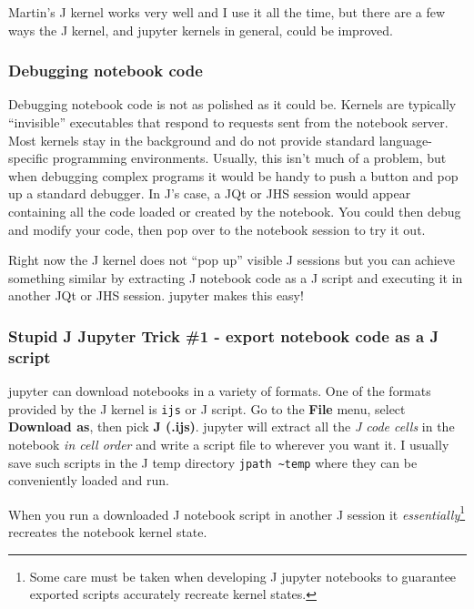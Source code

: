 Martin's J kernel works very well and I use it all the time, but there
are a few ways the J kernel, and jupyter kernels in general, could be
improved.

\hypertarget{debugging-notebook-code}{%
\subsubsection*{Debugging notebook code}\label{debugging-notebook-code}}

Debugging notebook code is not as polished as it could be. Kernels are
typically ``invisible'' executables that respond to requests sent from
the notebook server. Most kernels stay in the background and do not
provide standard language-specific programming environments. Usually,
this isn't much of a problem, but when debugging complex programs it
would be handy to push a button and pop up a standard debugger. In J's
case, a JQt or JHS session would appear containing all the code loaded
or created by the notebook. You could then debug and modify your code,
then pop over to the notebook session to try it out.

Right now the J kernel does not ``pop up'' visible J sessions but you
can achieve something similar by extracting J notebook code as a J
script and executing it in another JQt or JHS session. jupyter makes
this easy!

\hypertarget{stupid-j-jupyter-trick-1---export-notebook-code-as-a-j-script}{%
\subsubsection*{Stupid J Jupyter Trick \#1 - export notebook code as a J
script}\label{stupid-j-jupyter-trick-1---export-notebook-code-as-a-j-script}}

jupyter can download notebooks in a variety of formats. One of the
formats provided by the J kernel is \texttt{ijs} or J script. Go to the
\textbf{File} menu, select \textbf{Download as}, then pick \textbf{J
(.ijs)}. jupyter will extract all the \emph{J code cells} in the
notebook \emph{in cell order} and write a script file to wherever you
want it. I usually save such scripts in the J temp directory \texttt{jpath
\textasciitilde temp} where they can be conveniently loaded and run.

When you run a downloaded J notebook script in another J session it
\emph{essentially}\footnote{Some care must be taken when developing J jupyter notebooks to
guarantee exported scripts accurately recreate kernel states.} recreates the notebook kernel state.


